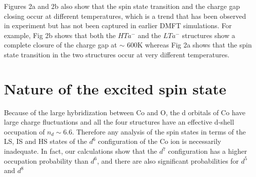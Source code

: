 \documentclass[10pt]{ruthesis}
\begin{document}
{Figures 2a and 2b also show that the spin state transition and the charge gap closing occur at different temperatures, which is a trend that has been observed in experiment but has not been captured in earlier DMFT simulations. For example, Fig 2b shows that both the $HTa^-$ and the $LTa^-$ structures show a complete closure of the charge gap at $\sim$ 600K whereas Fig 2a shows that the spin state transition in the two structures occur at very different temperatures. 



\section{Nature of the excited spin state}
 Because of the large hybridization between Co and O, the d orbitals of Co have large charge fluctuations and all the four structures have an effective d-shell occupation of $n_d \sim 6.6$. Therefore any analysis of the spin states in terms of the LS, IS and HS states of the $d^6$ configuration of the Co ion is necessarily inadequate. In fact, our calculations show that the $d^7$ configuration has a higher occupation probability than $d^6$, and there are also significant probabilities for $d^5$ and $d^8$

}
\end{document}
